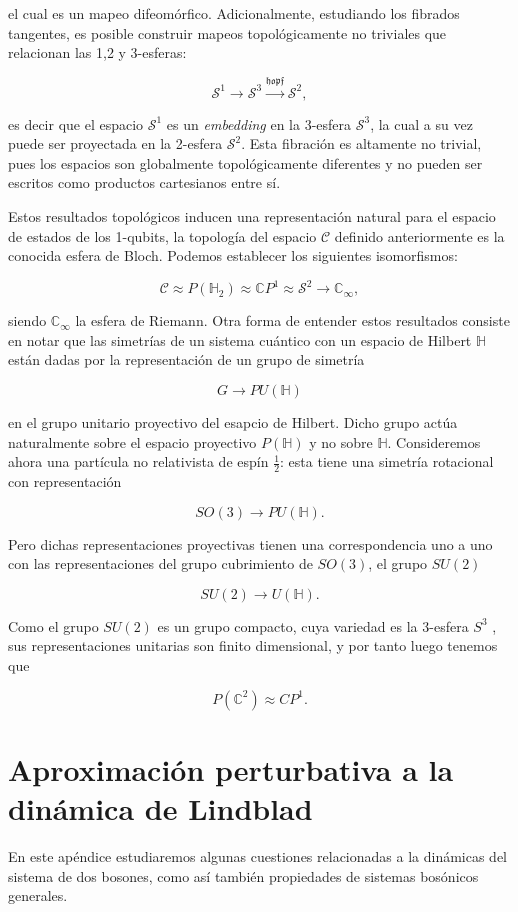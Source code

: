 \documentclass{report} %
\numberwithin{equation}{section}
\begin{document}
el cual es un mapeo difeomórfico. Adicionalmente, estudiando los fibrados tangentes,
es posible construir mapeos topológicamente no triviales que relacionan las 1,2 y 3-esferas:

$$
\mathcal{S}^{1} \rightarrow \mathcal{S}^{3} \xrightarrow{{\mathfrak{hopf}}} \mathcal{S}^{2},
$$

es decir que el espacio $\mathcal{S}^{1}$ es un \textit{embedding} en la 3-esfera $\mathcal{S}^{3}$, la cual a su vez puede ser proyectada en la 2-esfera $\mathcal{S}^{2}$. Esta fibración es altamente no trivial, pues los espacios son globalmente topológicamente diferentes y no pueden ser escritos como productos cartesianos entre sí. 

Estos resultados topológicos inducen una representación natural para el espacio de estados de los 1-qubits, la topología del espacio $\mathcal{C}$ definido anteriormente es la conocida esfera de Bloch. Podemos establecer los siguientes isomorfismos:

$$
\mathcal{C} \approx P(\mathds{H}_{2}) \approx \mathds{C}P^{1} \approx \mathcal{S}^{2} \rightarrow \mathds{C}_{\infty},
$$

siendo $\mathds{C}_{\infty}$ la esfera de Riemann. Otra forma de entender estos resultados consiste en notar que las simetrías de un sistema cuántico con un espacio de Hilbert $\mathds{H}$ están dadas por la representación de un grupo de simetría 

$$
G \rightarrow PU(\mathds{H})
$$

en el grupo unitario proyectivo del esapcio de Hilbert. Dicho grupo actúa naturalmente sobre el espacio proyectivo $P(\mathds{H})$ y no sobre $\mathds{H}$. Consideremos ahora una partícula no relativista de espín $\frac{1}{2}$: esta tiene una simetría rotacional con representación

$$
SO(3) \rightarrow PU(\mathds{H}).
$$

Pero dichas representaciones proyectivas tienen una correspondencia uno a uno con las representaciones del grupo cubrimiento de $SO(3)$, el grupo $SU(2)$

$$ 
SU(2) \rightarrow U(\mathds{H}). 
$$

Como el grupo $SU(2)$ es un grupo compacto, cuya variedad es la 3-esfera $S^3$ \cite{HoracioI}, sus representaciones unitarias son finito dimensional, y por tanto luego tenemos que 

$$
P(\mathds{C}^2) \approx CP^{1}.
$$

\chapter{Aproximaci\'on perturbativa a la din\'amica de Lindblad}
\label{ApendixA}
En este apéndice estudiaremos algunas cuestiones relacionadas a la dinámicas del sistema de dos bosones, como así también propiedades de sistemas bosónicos generales. 
\end{document}
